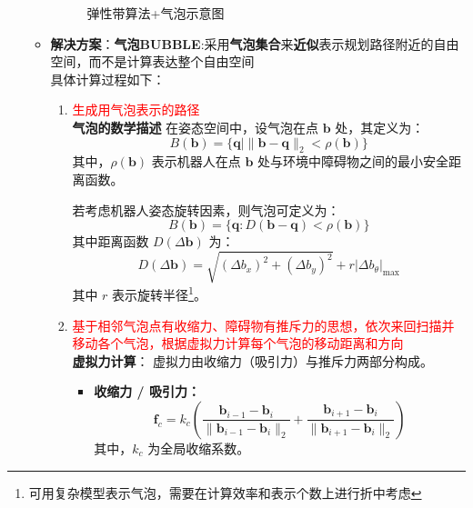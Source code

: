 \documentclass[../main.tex]{subfiles}
\begin{document}
\begin{enumerate}
\begin{itemize}
\begin{figure}[H]
                        \caption{弹性带算法+气泡示意图}
                    \end{figure}
            \item \textbf{解决方案}：\textbf{气泡BUBBLE}:采用\textbf{气泡集合}来\textbf{近似}表示规划路径附近的自由空间，而不是计算表达整个自由空间\\
                \small{}
                具体计算过程如下：
                \begin{enumerate}
    
    \item \textcolor{red}{生成用气泡表示的路径}\\\textbf{气泡的数学描述}
    在姿态空间中，设气泡在点 $\mathbf{b}$ 处，其定义为：
    \[
        B(\mathbf{b}) = \{ \mathbf{q} \mid \| \mathbf{b} - \mathbf{q} \|_2 < \rho(\mathbf{b}) \}
    \]
    其中，$\rho(\mathbf{b})$ 表示机器人在点 $\mathbf{b}$ 处与环境中障碍物之间的最小安全距离函数。  

    若考虑机器人姿态旋转因素，则气泡可定义为：
    \[
        B(\mathbf{b}) = \{ \mathbf{q} : D(\mathbf{b} - \mathbf{q}) < \rho(\mathbf{b}) \}
    \]
    其中距离函数 $D(\Delta \mathbf{b})$ 为：
    \[
        D(\Delta \mathbf{b}) = \sqrt{(\Delta b_x)^2 + (\Delta b_y)^2} + r \left| \Delta b_\theta \right|_{\max}
    \]
    其中 $r$ 表示旋转半径\footnote{可用复杂模型表示气泡，需要在计算效率和表示个数上进行折中考虑}。


    \item     \textcolor{red}{基于相邻气泡点有收缩力、障碍物有推斥力的思想，依次来回扫描并移动各个气泡，根据虚拟力计算每个气泡的移动距离和方向}\\\textbf{虚拟力计算}：
    \vspace{1em}
    虚拟力由收缩力（吸引力）与推斥力两部分构成。

    \begin{itemize}
        \item \textbf{收缩力 / 吸引力：}
        \[
            \mathbf{f}_c = k_c \left( 
            \frac{\mathbf{b}_{i-1} - \mathbf{b}_i}{\|\mathbf{b}_{i-1} - \mathbf{b}_i\|_2} + 
            \frac{\mathbf{b}_{i+1} - \mathbf{b}_i}{\|\mathbf{b}_{i+1} - \mathbf{b}_i\|_2} 
            \right)
        \]
        其中，$k_c$ 为全局收缩系数。


\end{itemize}
\end{enumerate}
\end{itemize}
\end{enumerate}
\end{document}
